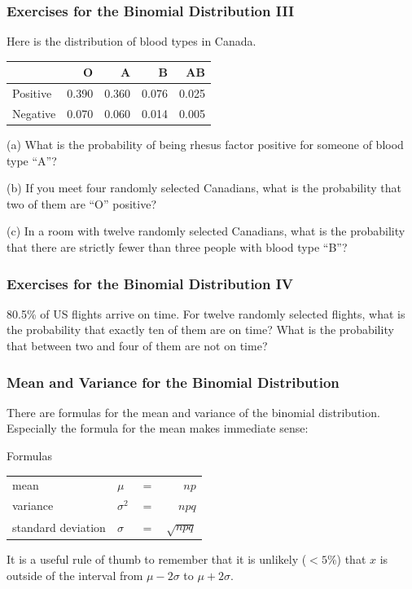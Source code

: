 \documentclass[xcolor=dvipsnames]{beamer}
\begin{document}
\begin{frame}
  \frametitle{Exercises for the Binomial Distribution III}
  {\ubung} Here is the distribution of blood types in Canada.

\bigskip

  \begin{tabular}{|l|r|r|r|r|}\hline
         & O     & A     & B     & AB    \\ \hline
Positive & 0.390 & 0.360 & 0.076 & 0.025 \\ \hline
Negative & 0.070 & 0.060 & 0.014 & 0.005 \\ \hline
  \end{tabular}

\bigskip

(a) What is the probability of being rhesus factor positive for
someone of blood type ``A''?

\medskip

(b) If you meet four randomly selected Canadians, what is the
probability that two of them are ``O'' positive?

\medskip

(c) In a room with twelve randomly selected Canadians, what is the
probability that there are strictly fewer than three people with
blood type ``B''?
\end{frame}

\begin{frame}
  \frametitle{Exercises for the Binomial Distribution IV}
  {\ubung} 80.5\% of US flights arrive on time. For twelve randomly
  selected flights, what is the probability that exactly ten of them
  are on time? What is the probability that between two and four of
  them are not on time?
\end{frame}

\begin{frame}
  \frametitle{Mean and Variance for the Binomial Distribution}
There are formulas for the mean and variance of the binomial
distribution. Especially the formula for the mean makes immediate
sense:
\begin{block}{Formulas}
  \begin{tabular}{llcr}
  mean& $\mu$&$=$&$np$ \\ 
  variance& $\sigma^{2}$&$=$&$npq$ \\
  standard deviation& $\sigma$&$=$&$\sqrt{npq}$
  \end{tabular}
\end{block}
It is a useful rule of thumb to remember that it is unlikely ($<5\%$)
that $x$ is outside of the interval from $\mu-2\sigma$ to
$\mu+2\sigma$.
\end{frame}
\end{document}
